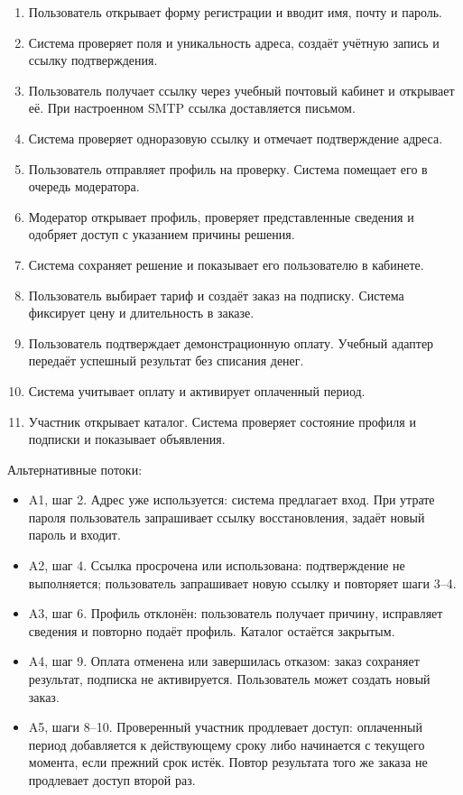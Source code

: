 \begin{enumerate}
\item Пользователь открывает форму регистрации и вводит имя, почту и пароль.
\item Система проверяет поля и уникальность адреса, создаёт учётную запись и ссылку подтверждения.
\item Пользователь получает ссылку через учебный почтовый кабинет и открывает её. При настроенном SMTP ссылка доставляется письмом.
\item Система проверяет одноразовую ссылку и отмечает подтверждение адреса.
\item Пользователь отправляет профиль на проверку. Система помещает его в очередь модератора.
\item Модератор открывает профиль, проверяет представленные сведения и одобряет доступ с указанием причины решения.
\item Система сохраняет решение и показывает его пользователю в кабинете.
\item Пользователь выбирает тариф и создаёт заказ на подписку. Система фиксирует цену и длительность в заказе.
\item Пользователь подтверждает демонстрационную оплату. Учебный адаптер передаёт успешный результат без списания денег.
\item Система учитывает оплату и активирует оплаченный период.
\item Участник открывает каталог. Система проверяет состояние профиля и подписки и показывает объявления.
\end{enumerate}

Альтернативные потоки:

\begin{itemize}
\item A1, шаг 2. Адрес уже используется: система предлагает вход. При утрате пароля пользователь запрашивает ссылку восстановления, задаёт новый пароль и входит.
\item A2, шаг 4. Ссылка просрочена или использована: подтверждение не выполняется; пользователь запрашивает новую ссылку и повторяет шаги 3–4.
\item A3, шаг 6. Профиль отклонён: пользователь получает причину, исправляет сведения и повторно подаёт профиль. Каталог остаётся закрытым.
\item A4, шаг 9. Оплата отменена или завершилась отказом: заказ сохраняет результат, подписка не активируется. Пользователь может создать новый заказ.
\item A5, шаги 8–10. Проверенный участник продлевает доступ: оплаченный период добавляется к действующему сроку либо начинается с текущего момента, если прежний срок истёк. Повтор результата того же заказа не продлевает доступ второй раз.
\end{itemize}

